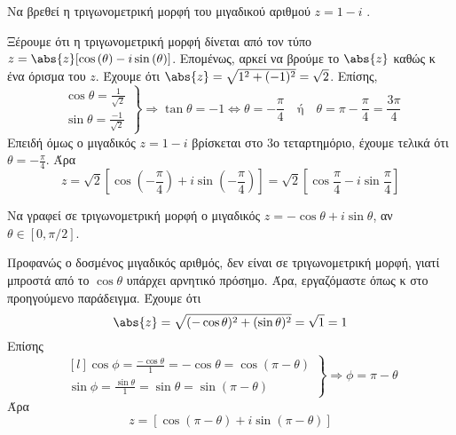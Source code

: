 \documentclass[a4paper,table]{report}
\begin{document}
  \begin{example}
    Να βρεθεί η τριγωνομετρική μορφή του μιγαδικού αριθμού $ z=1-i $ . 
  \end{example}
  \begin{solution}
    Ξέρουμε ότι η τριγωνομετρική μορφή δίνεται από τον τύπο 
    $ z = \abs{z} [\cos{(\theta)} - i \sin{(\theta)}] $. 
    Επομένως, αρκεί να βρούμε το $ \abs{z} $ καθώς κ ένα όρισμα 
    του $z$. Έχουμε ότι $ \abs{z} = \sqrt{1^{2}+(-1)^{2}} = \sqrt{2} $. Επίσης,
    \[
      \left.
        \begin{matrix}
          \cos{\theta} = \frac{1}{\sqrt{2}} \\[10pt]
          \sin{\theta} = \frac{-1}{\sqrt{2}} 
        \end{matrix} 
      \right\} 
      \Rightarrow 
      \tan{\theta} = -1 \Leftrightarrow \theta = -\frac{\pi}{4} \quad \text{ή} \quad 
      \theta = \pi - \frac{\pi}{4} = \frac{3 \pi}{4}
    \] 
    Επειδή όμως ο μιγαδικός $ z=1-i $ βρίσκεται στο 3ο τεταρτημόριο, έχουμε 
    τελικά ότι $ \theta = -\frac{\pi}{4} $. Άρα 
    \[
      \boxed{z= \sqrt{2} \left[ \cos{(-\frac{\pi}{4})} + i 
      \sin{(-\frac{\pi}{4})}\right]} = \sqrt{2} \left[ \cos{\frac{\pi}{4} - i
  \sin{\frac{\pi}{4}}} \right]
    \]
  \end{solution}

  \begin{example}
    Να γραφεί σε τριγωνομετρική μορφή ο μιγαδικός $ z=- \cos{\theta} + i \sin{\theta}
    $, αν $ \theta \in [0, \pi /2] $.
  \end{example}
  \begin{solution}
    Προφανώς ο δοσμένος μιγαδικός αριθμός, δεν είναι σε τριγωνομετρική μορφή, γιατί 
    μπροστά από το $ \cos{\theta} $ υπάρχει αρνητικό πρόσημο. Άρα, εργαζόμαστε όπως 
    κ στο προηγούμενο παράδειγμα. Έχουμε ότι 
    \[ \abs{z} = \sqrt{(- \cos{\theta} )^{2}+
    (\sin{\theta} )^{2}} = \sqrt{1} = 1 \]
    Επίσης
    \[
      \left.
        \begin{matrix*}[l]
          \cos{\phi} = \frac{- \cos{\theta}}{1} = - \cos{\theta} = \cos{(\pi - \theta)}
          \\[10pt]
          \sin{\phi} = \frac{\sin{\theta}}{1} = \sin{\theta} = \sin{(\pi - \theta)}
        \end{matrix*} 
      \right\} 
      \Rightarrow 
      \phi = \pi - \theta
    \] 
    Άρα 
    \[
      \boxed{z = \left[\cos{(\pi - \theta)} + i \sin{(\pi - \theta)} \right]}
    \] 
  \end{solution}
\end{document}
